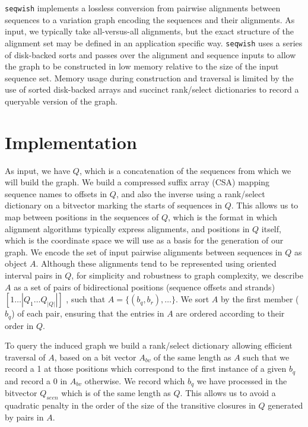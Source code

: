 \documentclass{bioinfo}
\begin{document}
    \texttt{seqwish} implements a lossless conversion from pairwise alignments between sequences to a variation graph encoding the sequences and their alignments.
    As input, we typically take all-versus-all alignments, but the exact structure of the alignment set may be defined in an application specific way.
    \texttt{seqwish} uses a series of disk-backed sorts and passes over the alignment and sequence inputs to allow the graph to be constructed in low memory relative to the size of the input sequence set.
    Memory usage during construction and traversal is limited by the use of sorted disk-backed arrays and succinct rank/select dictionaries to record a queryable version of the graph.

    


    \section{Implementation}
    \label{sec:implementation}
    As input, we have $Q$, which is a concatenation of the sequences from which we will build the graph.
    We build a compressed suffix array (CSA) mapping sequence names to offsets in $Q$, and also the inverse using a rank/select dictionary on a bitvector marking the starts of sequences in $Q$.
    This allows us to map between positions in the sequences of $Q$, which is the format in which alignment algorithms typically express alignments, and positions in $Q$ itself, which is the coordinate space we will use as a basis for the generation of our graph.
    We encode the set of input pairwise alignments between sequences in $Q$ as object $A$.
    Although these alignments tend to be represented using oriented interval pairs in $Q$, for simplicity and robustness to graph complexity, we describe $A$ as a set of pairs of bidirectional positions (sequence offsets and strands) $[1 \ldots |Q_1 \ldots Q_{|Q|}|]$ , such that $A = \{ (b_{q}, b_{r}), \ldots \}$.
    We sort $A$ by the first member ($b_{q}$) of each pair, ensuring that the entries in $A$ are ordered according to their order in $Q$.

    To query the induced graph we build a rank/select dictionary allowing efficient traversal of $A$, based on a bit vector $A_{bv}$ of the same length as $A$ such that we record a 1 at those positions which correspond to the first instance of a given $b_{q}$ and record a 0 in $A_{bv}$ otherwise.
    We record which $b_{q}$ we have processed in the bitvector $Q_{seen}$ which is of the same length as $Q$.
    This allows us to avoid a quadratic penalty in the order of the size of the transitive closures in $Q$ generated by pairs in $A$.
\end{document}
